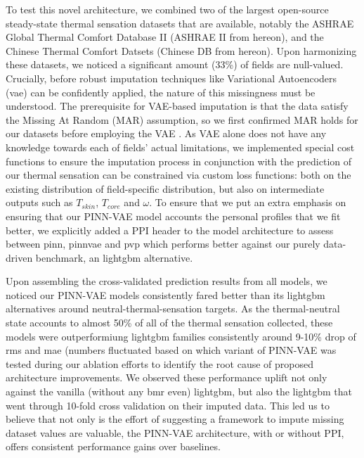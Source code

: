 To test this novel architecture, we combined two of the largest open-source steady-state thermal sensation datasets that are available, notably the ASHRAE Global Thermal Comfort Database II (ASHRAE II from hereon), and the Chinese Thermal Comfort Datsets (Chinese DB from hereon)\cite{foldvary2018ashrae,yang2023chinese}. Upon harmonizing these datasets, we noticed a significant amount (33\%) of fields are null-valued. Crucially, before robust imputation techniques like Variational Autoencoders (\gls{vae}) can be confidently applied, the nature of this missingness must be understood. The prerequisite for VAE-based imputation is that the data satisfy the Missing At Random (MAR) assumption, so we first confirmed MAR holds for our datasets before employing the VAE \cite{nazabal2020handling}. As VAE alone does not have any knowledge towards each of fields' actual limitations, we implemented special cost functions to ensure the imputation process in conjunction with the prediction of our thermal sensation can be constrained via custom loss functions: both on the existing distribution of field-specific distribution\cite{Raissi2019PINN}, but also on intermediate outputs such as $T_{skin}$, $T_{core}$ and $\omega$. To ensure that we put an extra emphasis on ensuring that our PINN-VAE model accounts the personal profiles that we fit better, we explicitly added a PPI header to the model architecture to assess between \gls{pinn}, \gls{pinnvae} and \gls{pvp} which performs better against our purely data-driven benchmark, an lightgbm alternative.

Upon assembling the cross-validated prediction results from all models, we noticed our PINN-VAE models consistently fared better than its lightgbm alternatives\cite{ke2017lightgbm} around neutral-thermal-sensation targets. As the thermal-neutral state accounts to almost 50\% of all of the thermal sensation collected, these models were outperformiung lightgbm families consistently around 9-10\% drop of \gls{rms} and \gls{mae} (numbers fluctuated based on which variant of PINN-VAE was tested during our ablation efforts to identify the root cause of proposed architecture improvements. We observed these performance uplift not only against the vanilla (without any \gls{bmr} even) lightgbm, but also the lightgbm that went through 10-fold cross validation on their imputed data. This led us to believe that not only is the effort of suggesting a framework to impute missing dataset values are valuable, the PINN-VAE architecture, with or without PPI, offers consistent performance gains over baselines.

